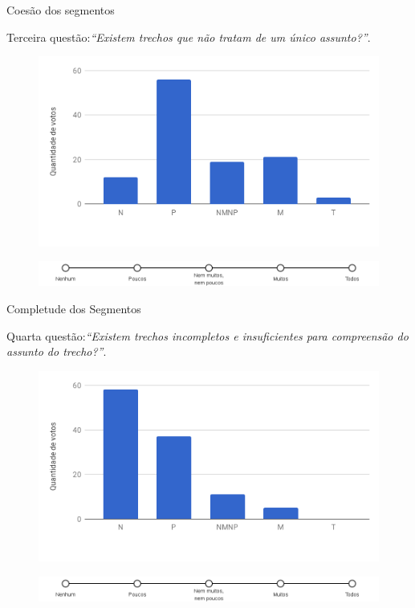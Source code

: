 \documentclass[xcolor=table]{beamer}
\begin{document}
\begin{frame}{Coesão dos segmentos}

	\center \small 
	Terceira questão:\textit{``Existem trechos que não tratam de um único assunto?''}. 

\begin{figure}[!h] \centering     %
	\includegraphics[width=.48\textwidth]{images/figuras-experimento/Q3-Seg.png}
\end{figure}


\begin{figure}[!h] \centering     %
	\includegraphics[width=.9\textwidth]{images/likert-1.png}
\end{figure}


\end{frame}



\begin{frame}{Completude dos Segmentos}

	\center \small 
	Quarta questão:\textit{``Existem trechos incompletos e insuficientes para compreensão do assunto do trecho?''}.


\begin{figure}[!h] \centering     %

	\includegraphics[width=.48\textwidth]{images/figuras-experimento/Q4-Seg.png}
	\label{fig:Q4}
\end{figure}

\begin{figure}[!h] \centering     %
	\includegraphics[width=.9\textwidth]{images/likert-1.png}
\end{figure}

\end{frame}
\end{document}
